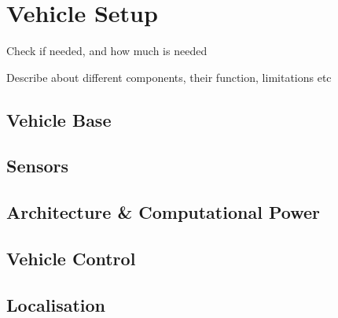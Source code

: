 \chapter{Vehicle Setup}
\label{vehicle_info}
Check if needed, and how much is needed

Describe about different components, their function, limitations etc

\section{Vehicle Base}
\section{Sensors}
\section{Architecture \& Computational Power}
\section{Vehicle Control}
\section{Localisation}
